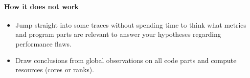 \paragraph*{How it does not work}

\begin{itemize}[noitemsep]
  \item[$\boxminus$] Jump straight into some traces without spending time to
  think what metrics and program parts are relevant to answer your
  hypotheses regarding  performance flaws.
  \item[$\boxminus$] Draw conclusions from global observations on all code parts
  and compute resources (cores or ranks).
\end{itemize}
